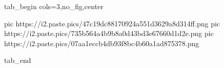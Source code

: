  
 
 
 
 


\ifcmt
  tab_begin cols=3,no_fig,center

     pic https://i2.paste.pics/47c19dc88170924a551d3629a8d314ff.png
		 pic https://i2.paste.pics/735b564a4b9b8a0d43bd3e67660d1d2e.png
		 pic https://i2.paste.pics/07aa1eccb4db93f8bc4b60a1ad875378.png

  tab_end
\fi
